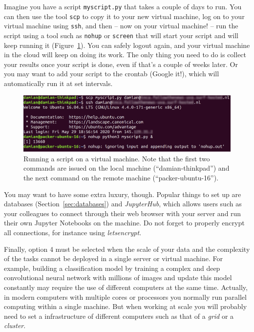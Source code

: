 Imagine you have a script \verb|myscript.py| that takes a couple of days to
run. You can then use the tool \verb|scp| to copy it to your new virtual
machine, log on to your virtual machine using \verb|ssh|, and then -- now
on your virtual machine! -- run the script using a tool such as
\verb|nohup| or \verb|screen| that will start your script and will keep running
it (Figure~\ref{fig:ssh}). You can safely logout again, and your
virtual machine in the cloud will keep on doing its work. The only
thing you need to do is collect your results once your script is done,
even if that's a couple of weeks later. Or you may want to add your
script to the crontab (Google it!), which will automatically run
it at set intervals.

\begin{figure}[!tbp]
  \centering
  \includegraphics[width=\textwidth]{figures/ssh.png}
  \caption{\label{fig:ssh}Running a script on a virtual machine. Note that the first two commands are issued on the local machine (``damian-thinkpad'') and the next command on the remote machine (``packer-ubuntu-16'').}
\end{figure}

You may want to have some extra luxury, though. Popular things to
set up are databases (Section~\ref{sec:databases}) and \emph{JupyterHub}, which
allows users such as your colleagues to connect through their
web browser with your server and run their own Jupyter Notebooks
on the machine. Do not forget to properly encrypt all connections,
for instance using \emph{letsencrypt}.

Finally, option 4 must be selected when the scale of your data and the complexity of the tasks cannot be deployed in a single server or virtual machine. For example, building a classification model by training a complex and deep convolutional neural network with millions of images and update this model constantly may require the use of different computers at the same time. Actually, in modern computers with multiple cores or processors you normally run parallel computing within a single machine. But when working at scale you will probably need to set a infrastructure of different computers such as that of a \textit{grid} or a \textit{cluster}.

